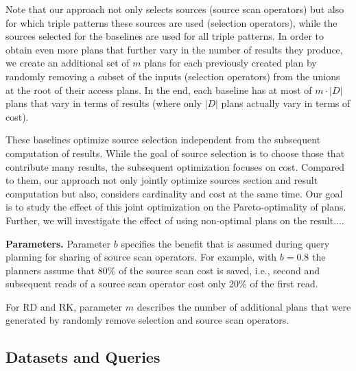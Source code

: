 Note that our approach not only selects sources (source scan operators) but also for which triple patterns these sources are used (selection operators), while the sources selected for the baselines are used for all triple patterns. In order to obtain even more plans that further vary in the number of results they produce, we create an additional set of $m$ plans for each
previously created plan by randomly removing a subset of the inputs (selection operators) from the unions at the root of their access plans. 
In the end, each baseline
has at most of $m \cdot |D|$ plans that vary in terms of results (where only $|D|$ plans actually vary in terms of cost). 

These baselines optimize source selection independent from the subsequent computation of results. While the goal of source selection is to choose those that contribute many results, the subsequent optimization focuses on cost. Compared to them, our approach not only jointly optimize sources section and result computation but also, considers cardinality and cost at the same time. Our goal is to study the effect of this joint optimization on the Pareto-optimality of plans. Further, we will investigate the effect of using non-optimal plans on the result....


\textbf{Parameters.} Parameter $b$ specifies the benefit that is
assumed during query planning for sharing of source scan
operators. For example, with $b=0.8$ the planners assume that 80\% of
the source scan cost is saved, i.e., second and subsequent reads of a
source scan operator cost only 20\% of the first read.

For RD and RK, parameter $m$ describes the number of additional plans
that were generated by randomly remove selection and source scan
operators.

\subsection{Datasets and Queries}


